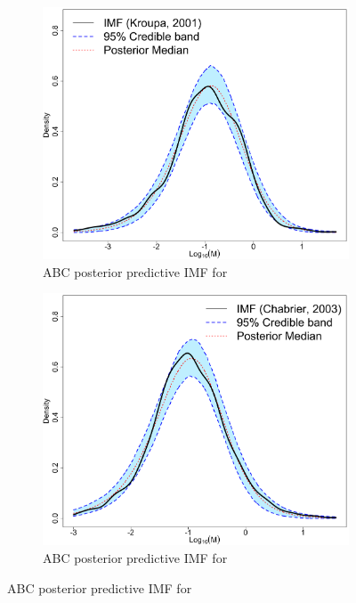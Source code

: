 \documentclass[ejs]{imsart}
\numberwithin{equation}{section}
\theoremstyle{plain}
\begin{document}
\begin{figure} \centering
\begin{subfigure}{0.47\textwidth}
\centering
\includegraphics[width = .95\textwidth]{figures/kroupa_abc_imf.pdf} 
\caption{ABC posterior predictive IMF for \cite{kroupa2001} }\label{subfig:kroupa_abc_imf}
\end{subfigure}
\begin{subfigure}{0.47\textwidth}
\centering
\includegraphics[width = .95\textwidth]{figures/chabrier_abc_imf.pdf} 
\caption{ABC posterior predictive IMF for \cite{Chabrier:2003oq, Chabrier:2003om}}\label{subfig:chabrier_abc_imf}
\end{subfigure}

\end{figure}
\end{document}
